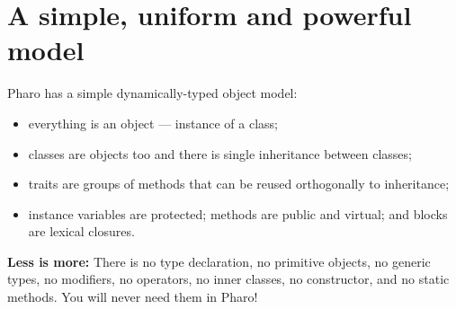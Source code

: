 \documentclass[notumble]{leaflet}
\begin{document}
\section{A simple, uniform and powerful model}

Pharo has a simple dynamically-typed object model:

\begin{itemize}
\item everything is an object --- instance of a class;
\item classes are objects too and there is single inheritance between classes;
\item traits are groups of methods that can be reused orthogonally to inheritance;
\item instance variables are protected; methods are public and virtual;
and blocks are lexical closures.
\end{itemize}

\textbf{Less is more:} There is no type declaration, no primitive
objects, no generic types, no modifiers, no operators, no inner
classes, no constructor, and no static methods. You will never need them in
Pharo!



\vfill{}
\end{document}
